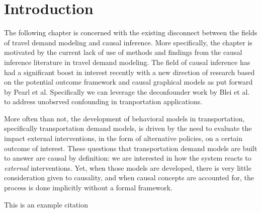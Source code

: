 \section{Introduction}
The following chapter is concerned with the existing disconnect between the fields of travel demand modeling and causal inference. More specifically, the chapter is motivated by the current lack of use of methods and findings from the causal inference literature in travel demand modeling. The field of causal inference has had a significant boost in interest recently with a new direction of research based on the potential outcome framework and causal graphical models as put forward by Pearl et al. Specifically we can leverage the deconfounder work by Blei et al. to address unobsrved confounding in tranportation applications.

More often than not, the development of behavioral models in transportation, specifically transportation demand models, is driven by the need to evaluate the impact external interventions, in the form of alternative policies, on a certain outcome of interest. These questions that transportation demand models are built to answer are causal by definition: we are interested in how the system reacts to \textit{external} interventions. Yet, when those models are developed, there is very little consideration given to causality, and when causal concepts are accounted for, the process is done implicitly without a formal framework. 



\blindtext[2]

This is an example citation \cite{brathwaite_2018_causal}
